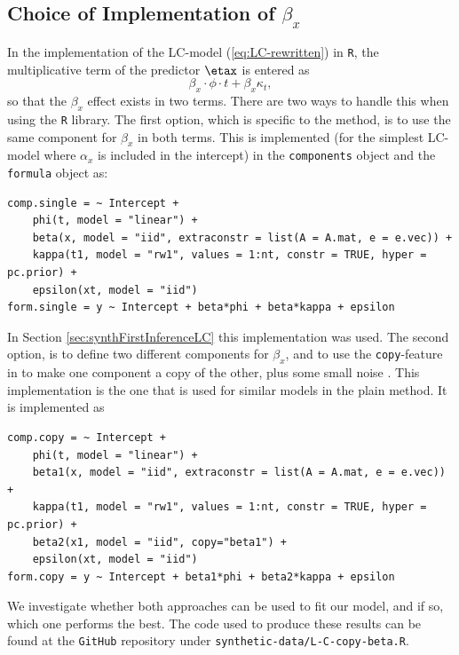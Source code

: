 \subsection{Choice of Implementation of $\beta_x$}
In the implementation of the LC-model (\ref{eq:LC-rewritten}) in \texttt{R}, the multiplicative term of the predictor $\etax$ is entered as
\begin{equation}
    \beta_x\cdot\phi \cdot t + \beta_x\kappa_t,
\end{equation}
so that the $\beta_x$ effect exists in two terms. There are two ways to handle this when using the \texttt{R} \inlabru library. The first option, which is specific to the \inlabru method, is to use the same component for $\beta_x$ in both terms. This is implemented (for the simplest LC-model where $\alpha_x$ is included in the intercept) in the \texttt{components} object and the \texttt{formula} object as:
\begin{verbatim}
comp.single = ~ Intercept + 
    phi(t, model = "linear") + 
    beta(x, model = "iid", extraconstr = list(A = A.mat, e = e.vec)) + 
    kappa(t1, model = "rw1", values = 1:nt, constr = TRUE, hyper = pc.prior) + 
    epsilon(xt, model = "iid")
form.single = y ~ Intercept + beta*phi + beta*kappa + epsilon
\end{verbatim}
In Section \ref{sec:synthFirstInferenceLC} this implementation was used. The second option, is to define two different components for $\beta_x$, and to use the \texttt{copy}-feature in \inla to make one component a copy of the other, plus some small noise \cite{MARTINS201368}. This implementation is the one that is used for similar models in the plain \inla method. It is implemented as
\begin{verbatim}
comp.copy = ~ Intercept + 
    phi(t, model = "linear") + 
    beta1(x, model = "iid", extraconstr = list(A = A.mat, e = e.vec)) + 
    kappa(t1, model = "rw1", values = 1:nt, constr = TRUE, hyper = pc.prior) + 
    beta2(x1, model = "iid", copy="beta1") +
    epsilon(xt, model = "iid")
form.copy = y ~ Intercept + beta1*phi + beta2*kappa + epsilon
\end{verbatim}
We investigate whether both approaches can be used to fit our model, and if so, which one performs the best. The code used to produce these results can be found at the \texttt{GitHub} repository under \texttt{synthetic-data/L-C-copy-beta.R}. 

